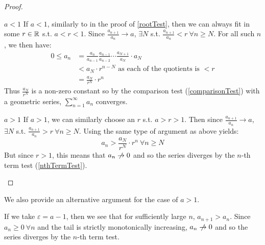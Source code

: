 \documentclass[../main.tex]{subfiles}
\begin{document}
\begin{proof}
  \begin{proofcases}
    \begin{case}{$a < 1$}
      If $a < 1$, similarly to in the proof of \cref{rootTest}, then we can always fit in some $r \in \mathbb{R}$ s.t. $a < r < 1$.
      Since $\frac{a_{n + 1}}{a_n} \to a$, $\exists N$ s.t. $\frac{a_{n + 1}}{a_n} < r\ \forall n \geq N$.
      For all such $n$, we then have:
      \begin{align*}
        0 \leq a_n &= \frac{a_n}{a_{n - 1}} \frac{a_{n - 1}}{a_{n - 2}} \cdots \frac{a_{N + 1}}{a_N} \cdot a_N \\
                                                     &< a_N \cdot r^{n - N} \text{ as each of the quotients is $< r$}\\
                                                     &= \frac{a_N}{r^{N}} \cdot r^{n}
      \end{align*}
      Thus $\frac{a_N}{r^{N}}$ is a non-zero constant so by the comparison test (\cref{comparisonTest}) with a geometric series, $\sum_{n = 1}^{\infty} a_n$ converges.
    \end{case}
    \begin{case}{$a > 1$}
      If $a > 1$, we can similarly choose an $r$ s.t. $a > r > 1$.
      Then since $\frac{a_{n + 1}}{a_n} \to a$, $\exists N$ s.t. $\frac{a_{n + 1}}{a_n} > r\ \forall n \geq N$.
      Using the same type of argument as above yields:
      \[
        a_n > \frac{a_N}{r^{N}} \cdot r^{n}\ \forall n \geq N
      \]
      But since $r > 1$, this means that $a_n \centernot\to 0$ and so the series diverges by the $n$-th term test (\cref{nthTermTest}).
    \end{case}
  \end{proofcases}
\end{proof}
\begin{remark}
  We also provide an alternative argument for the case of $a > 1$.

  If we take $\varepsilon = a - 1$, then we see that for sufficiently large $n$, $a_{n + 1} > a_n$.
  Since $a_n \geq 0\ \forall n$ and the tail is strictly monotonically increasing, $a_n \centernot\to 0$ and so the series diverges by the $n$-th term test.
\end{remark}
\end{document}
